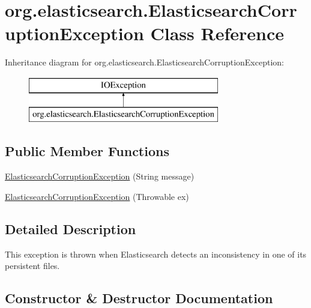 \hypertarget{classorg_1_1elasticsearch_1_1_elasticsearch_corruption_exception}{}\section{org.\+elasticsearch.\+Elasticsearch\+Corruption\+Exception Class Reference}
\label{classorg_1_1elasticsearch_1_1_elasticsearch_corruption_exception}
Inheritance diagram for org.\+elasticsearch.\+Elasticsearch\+Corruption\+Exception\+:\begin{figure}[H]
\begin{center}
\leavevmode
\includegraphics[height=2.000000cm]{classorg_1_1elasticsearch_1_1_elasticsearch_corruption_exception}
\end{center}
\end{figure}
\subsection*{Public Member Functions}
\begin{DoxyCompactItemize}
\item 
\hyperlink{classorg_1_1elasticsearch_1_1_elasticsearch_corruption_exception_adb85a4eb1872ef05cbbe11f6d193d91b}{Elasticsearch\+Corruption\+Exception} (String message)
\item 
\hyperlink{classorg_1_1elasticsearch_1_1_elasticsearch_corruption_exception_ab056deb66e8505b3b4d67e837af7c5bf}{Elasticsearch\+Corruption\+Exception} (Throwable ex)
\end{DoxyCompactItemize}


\subsection{Detailed Description}
This exception is thrown when Elasticsearch detects an inconsistency in one of it\textquotesingle{}s persistent files. 

\subsection{Constructor \& Destructor Documentation}
\hypertarget{classorg_1_1elasticsearch_1_1_elasticsearch_corruption_exception_adb85a4eb1872ef05cbbe11f6d193d91b}{}\label{classorg_1_1elasticsearch_1_1_elasticsearch_corruption_exception_adb85a4eb1872ef05cbbe11f6d193d91b} 
